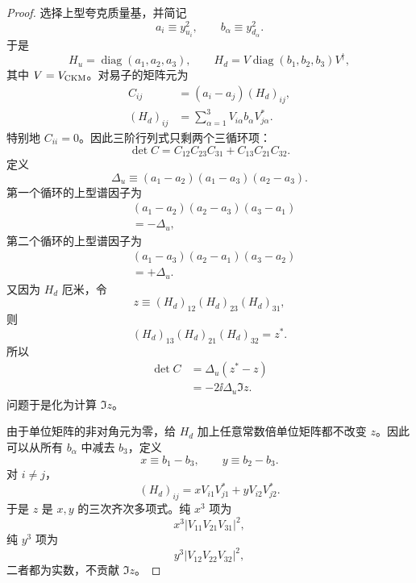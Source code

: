 \begin{proof}
选择上型夸克质量基，并简记
\begin{equation*}
 a_i\equiv y_{u_i}^2,
 \qquad
 b_\alpha\equiv y_{d_\alpha}^2.
\end{equation*}
于是
\begin{equation*}
 H_u=\operatorname{diag}(a_1,a_2,a_3),
 \qquad
 H_d=V\operatorname{diag}(b_1,b_2,b_3)V^\dagger,
\end{equation*}
其中 $V=V_{\rm CKM}$。对易子的矩阵元为
\begin{align*}
 C_{ij}
 &=(a_i-a_j)(H_d)_{ij},\\
 (H_d)_{ij}
 &=\sum_{\alpha=1}^{3}V_{i\alpha}b_\alpha V_{j\alpha}^*.
\end{align*}
特别地 $C_{ii}=0$。因此三阶行列式只剩两个三循环项：
\begin{equation*}
 \det C=C_{12}C_{23}C_{31}+C_{13}C_{21}C_{32}.
\end{equation*}
定义
\begin{equation*}
 \Delta_u\equiv
 (a_1-a_2)(a_1-a_3)(a_2-a_3).
\end{equation*}
第一个循环的上型谱因子为
\begin{align*}
 &(a_1-a_2)(a_2-a_3)(a_3-a_1)\\
 &=-\Delta_u,
\end{align*}
第二个循环的上型谱因子为
\begin{align*}
 &(a_1-a_3)(a_2-a_1)(a_3-a_2)\\
 &=+\Delta_u.
\end{align*}
又因为 $H_d$ 厄米，令
\begin{equation*}
 z\equiv(H_d)_{12}(H_d)_{23}(H_d)_{31},
\end{equation*}
则
\begin{equation*}
 (H_d)_{13}(H_d)_{21}(H_d)_{32}=z^*.
\end{equation*}
所以
\begin{align*}
 \det C
 &=\Delta_u(z^*-z)\\
 &=-2\ii\Delta_u\Im z.
\end{align*}
问题于是化为计算 $\Im z$。

由于单位矩阵的非对角元为零，给 $H_d$ 加上任意常数倍单位矩阵都不改变 $z$。因此可以从所有 $b_\alpha$ 中减去 $b_3$，定义
\begin{equation*}
 x\equiv b_1-b_3,
 \qquad
 y\equiv b_2-b_3.
\end{equation*}
对 $i\neq j$，
\begin{equation*}
 (H_d)_{ij}
 =xV_{i1}V_{j1}^*+yV_{i2}V_{j2}^*.
\end{equation*}
于是 $z$ 是 $x,y$ 的三次齐次多项式。纯 $x^3$ 项为
\begin{equation*}
 x^3|V_{11}V_{21}V_{31}|^2,
\end{equation*}
纯 $y^3$ 项为
\begin{equation*}
 y^3|V_{12}V_{22}V_{32}|^2,
\end{equation*}
二者都为实数，不贡献 $\Im z$。


\end{proof}
